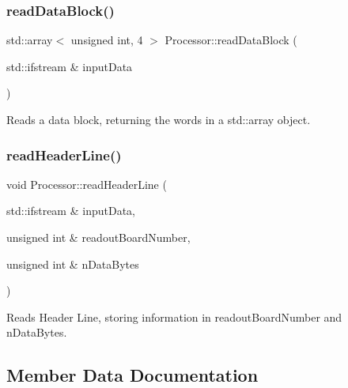 \mbox{\label{class_processor_ad64350d14782bb238703023cb56613ef}} 
\subsubsection{\texorpdfstring{read\+Data\+Block()}{readDataBlock()}}
{\footnotesize\ttfamily std\+::array$<$ unsigned int, 4 $>$ Processor\+::read\+Data\+Block (\begin{DoxyParamCaption}\item[{std\+::ifstream \&}]{input\+Data }\end{DoxyParamCaption})\hspace{0.3cm}{\ttfamily [private]}}



Reads a data block, returning the words in a std\+::array object. 

\mbox{\label{class_processor_a31c772cd0725c185b53d271b6149c400}} 
\subsubsection{\texorpdfstring{read\+Header\+Line()}{readHeaderLine()}}
{\footnotesize\ttfamily void Processor\+::read\+Header\+Line (\begin{DoxyParamCaption}\item[{std\+::ifstream \&}]{input\+Data,  }\item[{unsigned int \&}]{readout\+Board\+Number,  }\item[{unsigned int \&}]{n\+Data\+Bytes }\end{DoxyParamCaption})\hspace{0.3cm}{\ttfamily [private]}}



Reads Header Line, storing information in readout\+Board\+Number and n\+Data\+Bytes. 



\subsection{Member Data Documentation}
\mbox{\label{class_processor_a78d13a8646a95290e0b74bdd40c75639}} 
